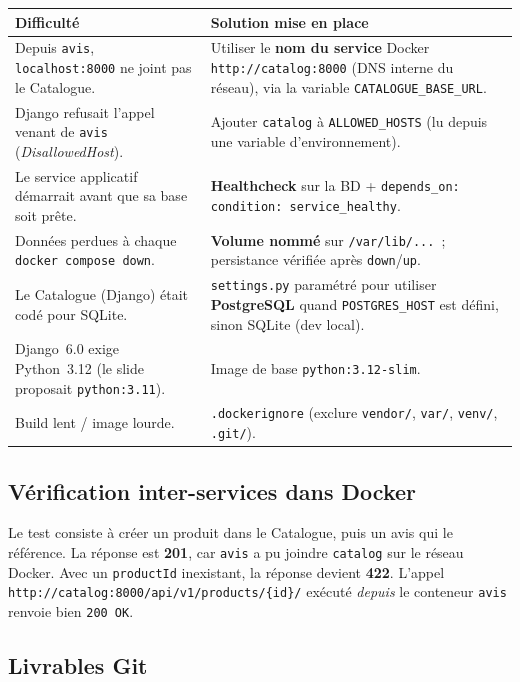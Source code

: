 \documentclass[11pt,a4paper]{article}
\begin{document}
\begin{tabularx}{\textwidth}{@{}P{5.6cm} Y@{}}
\toprule
\textbf{Difficulté} & \textbf{Solution mise en place} \\
\midrule
Depuis \texttt{avis}, \texttt{localhost:8000} ne joint pas le Catalogue. & Utiliser le \textbf{nom du service} Docker \texttt{http://catalog:8000} (DNS interne du réseau), via la variable \texttt{CATALOGUE\_BASE\_URL}. \\[4pt]
Django refusait l'appel venant de \texttt{avis} (\textit{DisallowedHost}). & Ajouter \texttt{catalog} à \texttt{ALLOWED\_HOSTS} (lu depuis une variable d'environnement). \\[4pt]
Le service applicatif démarrait avant que sa base soit prête. & \textbf{Healthcheck} sur la BD + \texttt{depends\_on: condition: service\_healthy}. \\[4pt]
Données perdues à chaque \texttt{docker compose down}. & \textbf{Volume nommé} sur \texttt{/var/lib/...}~; persistance vérifiée après \texttt{down}/\texttt{up}. \\[4pt]
Le Catalogue (Django) était codé pour SQLite. & \texttt{settings.py} paramétré pour utiliser \textbf{PostgreSQL} quand \texttt{POSTGRES\_HOST} est défini, sinon SQLite (dev local). \\[4pt]
Django~6.0 exige Python~3.12 (le slide proposait \texttt{python:3.11}). & Image de base \texttt{python:3.12-slim}. \\[4pt]
Build lent / image lourde. & \texttt{.dockerignore} (exclure \texttt{vendor/}, \texttt{var/}, \texttt{venv/}, \texttt{.git/}). \\
\bottomrule
\end{tabularx}

\subsection{Vérification inter-services dans Docker}

Le test consiste à créer un produit dans le Catalogue, puis un avis qui le référence. La réponse est \textbf{201}, car \texttt{avis} a pu joindre \texttt{catalog} sur le réseau Docker. Avec un \texttt{productId} inexistant, la réponse devient \textbf{422}. L'appel \texttt{http://catalog:8000/api/v1/products/\{id\}/} exécuté \emph{depuis} le conteneur \texttt{avis} renvoie bien \texttt{200~OK}.

\subsection{Livrables Git}
\end{document}
